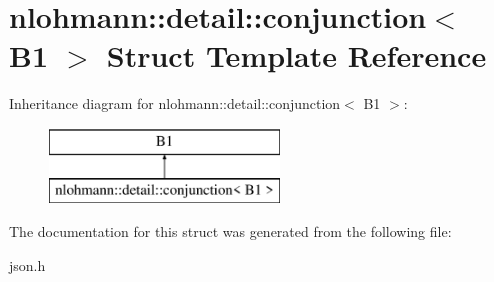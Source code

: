 \hypertarget{structnlohmann_1_1detail_1_1conjunction_3_01B1_01_4}{}\section{nlohmann\+:\+:detail\+:\+:conjunction$<$ B1 $>$ Struct Template Reference}
\label{structnlohmann_1_1detail_1_1conjunction_3_01B1_01_4}
Inheritance diagram for nlohmann\+:\+:detail\+:\+:conjunction$<$ B1 $>$\+:\begin{figure}[H]
\begin{center}
\leavevmode
\includegraphics[height=2.000000cm]{structnlohmann_1_1detail_1_1conjunction_3_01B1_01_4}
\end{center}
\end{figure}


The documentation for this struct was generated from the following file\+:\begin{DoxyCompactItemize}
\item 
json.\+h\end{DoxyCompactItemize}
